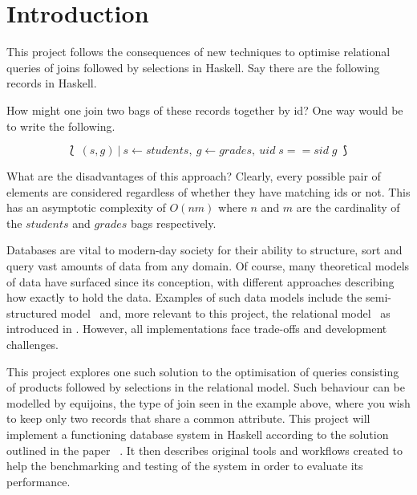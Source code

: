 \chapter{Introduction}
\begin{comment}
The introduction should summarise the subject area, the specific problem you are addressing, including key ideas for their solution, together with a summary of the project's main contributions. When detailing the contributions it is helpful to provide forward references to the section(s) of the report that provide the relevant technical details. The introduction should be aimed at an informed, but otherwise non-expert, reader. A good tip is to assume that all your assessors will read the abstract and introduction, whereas the more detailed technical sections may only be read by your first and second markers - it's therefore really important to get it right.
\end{comment}

This project follows the consequences of new techniques to optimise
relational queries of joins followed by selections in Haskell. Say there are the
following records in Haskell.



\noindent
How might one join two bags of these records together by id? One way would be to
write the following.

\[\lbag\:(s, g)\:|\:s \leftarrow students,\:g \leftarrow grades,\:uid\;s == sid\;g
\:\rbag\]

What are the disadvantages of this approach? Clearly, every possible pair of
elements are considered regardless of whether they have matching ids or not.
This has an asymptotic complexity of $O(nm)$ where $n$ and $m$ are the
cardinality of the $students$ and $grades$ bags respectively.

Databases are vital to modern-day society for their ability to structure, sort
and query vast amounts of data from any domain. Of course, many theoretical
models of data have surfaced since its conception, with different approaches
describing how exactly to hold the data. Examples of such data models include
the semi-structured model~\cite{DatabaseSystems} and, more relevant to this
project, the relational model~\cite{RelationalModel} as introduced in
. However, all implementations face trade-offs and
development challenges.

This project explores one such solution to the optimisation of queries
consisting of products followed by selections in the relational model. Such
behaviour can be modelled by equijoins, the type of join seen in the example
above, where you wish to keep only two records that share a common attribute.
This project will implement a functioning database system in Haskell according
to the solution outlined in the paper
\relalg{}~\cite{RelationalAlgebraByWayOfAdjunctions}. It then describes original
tools and workflows created to help the benchmarking and testing of the system
in order to evaluate its performance.


